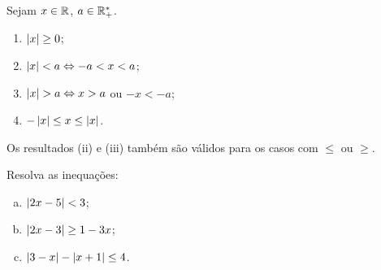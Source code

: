 \begin{proposition}
Sejam $x \in \mathbb{R}$, $a\in \mathbb{R}^*_+ $.
%
\begin{enumerate}
  \item $\left|x\right| \geq 0$;
  \item $\left|x\right| < a \Leftrightarrow -a < x < a$;
  \item $\left|x\right| > a \Leftrightarrow x > a$ ou $-x < -a$;
  \item $-\left|x\right| \leq x \leq \left|x\right|$.
\end{enumerate}
%
Os resultados (ii) e (iii) também são válidos para os casos com $\le$ ou $\ge$.
\end{proposition}

\begin{example}
Resolva as inequações:
%
\begin{enumerate}[(a)]
  \item $\left|2x-5\right| < 3$;
  \item $\left|2x-3\right| \geq 1-3x$;
  \item $\left|3-x\right| - \left|x+1\right| \leq 4$.
\end{enumerate}
\end{example}

